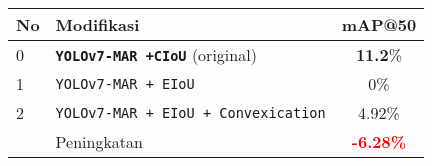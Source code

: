   \begin{tabular}{ l l c }
    \toprule[1.5pt]
    No & Modifikasi        &mAP@50 \\
    \midrule
    0  & \texttt{\textbf{YOLOv7-MAR +CIoU}} (original)     & \textbf{11.2}\%\\
    1  & \texttt{YOLOv7-MAR + EIoU}                & 0\%\\
    2  & \texttt{YOLOv7-MAR + EIoU + Convexication} & 4.92\%\\
    \midrule
       & Peningkatan                                & \textbf{\textcolor{red}{-6.28\%}}\\
    \bottomrule[1.5pt]
  \end{tabular}